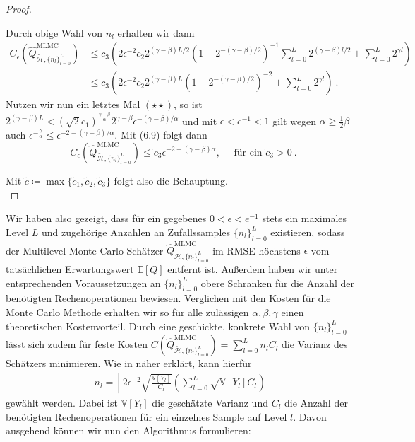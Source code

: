 \begin{proof}
\begin{enumerate}[label=(\roman*)]
\[		\]
		Durch obige Wahl von $ n_l $ erhalten wir dann 
		\begin{align*}
			C_{\epsilon}(\widehat{Q}_{\tilde{\mathcal{H}},\{ n_l \}_{l=0}^L }^{\text{MLMC}}) &\leq c_3 \left( 2\epsilon^{-2} c_2 2^{(\gamma-\beta)L/2}(1-2^{-(\gamma-\beta)/2})^{-1} \sum_{l=0}^L 2^{(\gamma -\beta)l/2} + \sum_{l=0}^L 2^{\gamma l} \right) \\
			&\leq c_3 \left( 2\epsilon^{-2} c_2 2^{(\gamma-\beta)L}(1-2^{-(\gamma-\beta)/2})^{-2}  + \sum_{l=0}^L 2^{\gamma l} \right) \ .
		\end{align*}
		Nutzen wir nun ein letztes Mal $ (\star \star) $, so ist $ 2^{(\gamma-\beta)L} < \left( \sqrt{2}c_1 \right)^{\frac{\gamma-\beta}{\alpha}} 2^{\gamma-\beta} \epsilon^{-(\gamma-\beta)/\alpha} $ und mit $ \epsilon < e^{-1} < 1 $ gilt wegen $ \alpha \geq \frac{1}{2}\beta $ auch $ \epsilon^{-\frac{\gamma}{\alpha}} \leq \epsilon^{-2 -(\gamma - \beta)/\alpha} $.
		Mit (6.9) folgt dann 
		\[
		C_{\epsilon}(\widehat{Q}_{\tilde{\mathcal{H}},\{ n_l \}_{l=0}^L }^{\text{MLMC}}) \leq \tilde{c}_3 \epsilon^{-2-(\gamma-\beta)\alpha} , \quad \text{  für ein } \tilde{c}_3>0 \ .
		\]
	\end{enumerate}
	Mit $ \tilde{c} \coloneqq \max\{\tilde{c}_1,\tilde{c}_2,\tilde{c}_3\} $ folgt also die Behauptung.\\
\end{proof}
Wir haben also gezeigt, dass für ein gegebenes $ 0 < \epsilon < e^{-1} $ stets ein maximales Level $ L $ und zugehörige Anzahlen an Zufallssamples $ \{n_l\}_{l=0}^L $
existieren, sodass der Multilevel Monte Carlo Schätzer $ \widehat{Q}_{\tilde{\mathcal{H}},\{ n_l \}_{l=0}^L }^{\text{MLMC}} $ im RMSE höchstens $ \epsilon $ vom tatsächlichen Erwartungswert $ \mathbb{E}[Q] $ entfernt ist. Außerdem haben wir unter entsprechenden Voraussetzungen an $ \{n_l\}_{l=0}^L $ obere Schranken für die Anzahl der benötigten Rechenoperationen bewiesen.
Verglichen mit den Kosten für die Monte Carlo Methode erhalten wir so für alle zulässigen $ \alpha,\beta,\gamma $ einen theoretischen Kostenvorteil. 
Durch eine geschickte, konkrete Wahl von $ \{n_l\}_{l=0}^L $ lässt sich zudem für feste Kosten $ C(\widehat{Q}_{\tilde{\mathcal{H}},\{ n_l \}_{l=0}^L }^{\text{MLMC}} ) = \sum_{l=0}^{L} n_l C_l$ die Varianz des Schätzers minimieren.
Wie in \cite{giles_2015} näher erklärt, kann hierfür 
\begin{align}
	\label{OptimalN}
	n_l = \left\lceil 2 \epsilon^{-2} \sqrt{\frac{\mathbb{V}[Y_l]}{C_l}} \left( \sum_{l=0}^{L}\sqrt{\mathbb{V}[Y_l]C_l} \right) \right\rceil
\end{align}
gewählt werden. Dabei ist $ \mathbb{V}[Y_l] $ die geschätzte Varianz und $ C_l $ die Anzahl der benötigten Rechenoperationen für ein einzelnes Sample auf Level $ l $.
Davon ausgehend können wir nun den Algorithmus formulieren:

